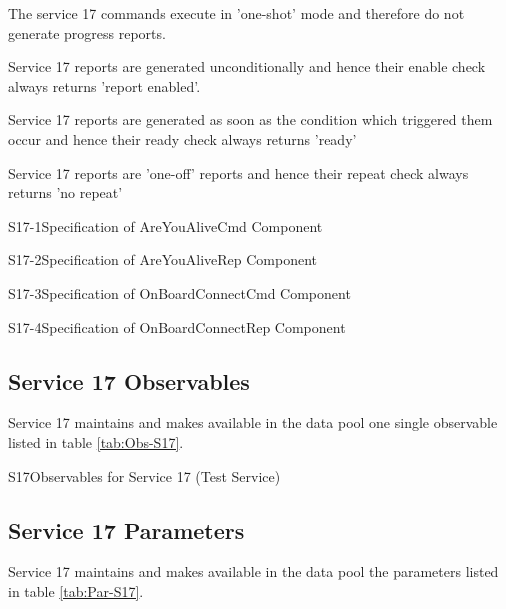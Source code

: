 \documentclass{pnp_article}
\begin{document}
\begin{fw_itemize}
\item The service 17 commands execute in 'one-shot' mode and therefore do not generate progress reports.
\item Service 17 reports are generated unconditionally and hence their enable check always returns 'report enabled'.
\item Service 17 reports are generated as soon as the condition which triggered them occur and hence their ready check always returns 'ready'
\item Service 17 reports are 'one-off' reports and hence their repeat check always returns 'no repeat'
\end{fw_itemize}

\newpage
\begin{cr_cmd}{S17-1}{Specification of AreYouAliveCmd Component}
\end{cr_cmd}

\begin{cr_rep}{S17-2}{Specification of AreYouAliveRep Component}
\end{cr_rep}

\newpage
\begin{cr_cmd}{S17-3}{Specification of OnBoardConnectCmd Component}
\end{cr_cmd}

\begin{cr_rep}{S17-4}{Specification of OnBoardConnectRep Component}
\end{cr_rep}



\subsection{Service 17 Observables}\label{sec:serv17Obs}
Service 17 maintains and makes available in the data pool one single observable listed in table \ref{tab:Obs-S17}.

\begin{cr_obs}{S17}{Observables for Service 17 (Test Service)}
\end{cr_obs}

\newpage
\subsection{Service 17 Parameters}\label{sec:serv17Par}
Service 17 maintains and makes available in the data pool the parameters listed in table \ref{tab:Par-S17}.
\end{document}
